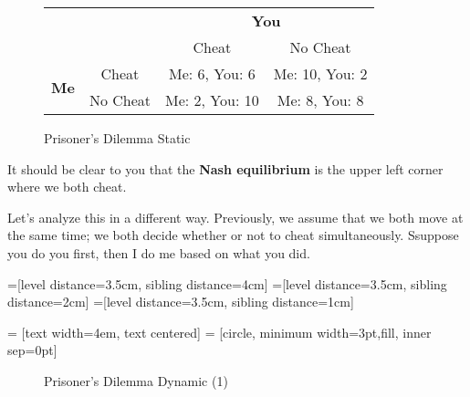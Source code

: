\documentclass[11pt]{scrartcl}
\begin{document}
\begin{figure}[H]
\centering
\begin{tabular}{rrcc}
& & \multicolumn{2}{c}{\textbf{You}} \\
& & Cheat & No Cheat \\ 
\cline{3-4}
\multirow{2}{*}{\textbf{Me}} & \multicolumn{1}{c|}{Cheat} & \multicolumn{1}{c|}{Me: 6, You: 6} & \multicolumn{1}{c|}{Me: 10, You: 2} \\
\cline{3-4}
& \multicolumn{1}{r|}{No Cheat} & \multicolumn{1}{c|}{Me: 2, You: 10} & \multicolumn{1}{c|}{Me: 8, You: 8} \\
\cline{3-4}
\end{tabular}
\caption{Prisoner's Dilemma Static}
\end{figure}

It should be clear to you that the \textbf{Nash equilibrium} is the upper left corner where we both cheat.

Let's analyze this in a different way. Previously, we assume that we both move at the same time; we both decide whether or not to cheat simultaneously. Ssuppose you do you first, then I do me based on what you did.

=[level distance=3.5cm, sibling distance=4cm]
=[level distance=3.5cm, sibling distance=2cm]
=[level distance=3.5cm, sibling distance=1cm]

 = [text width=4em, text centered]
 = [circle, minimum width=3pt,fill, inner sep=0pt]

\begin{figure}[H]
\centering
{}
\caption{Prisoner's Dilemma Dynamic (1)}
\end{figure}
\end{document}
